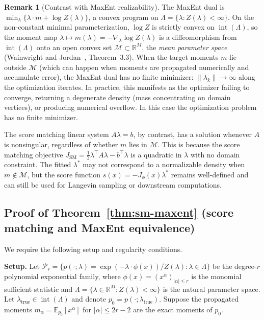 \documentclass{article}
\newcommand{\R}{\mathbb{R}}
\newcommand{\E}{\mathbb{E}}
\theoremstyle{definition}
\newtheorem{remark}{Remark}
\begin{document}
\begin{remark}[Contrast with MaxEnt realizability]\label{rmk:realizability}
The MaxEnt dual is $\min_\lambda \{\lambda \cdot m + \log Z(\lambda)\}$,
a convex program on $\Lambda = \{\lambda : Z(\lambda) < \infty\}$.
On the non-constant minimal parameterization, $\log Z$ is strictly convex on $\operatorname{int}(\Lambda)$, so
the moment map $\lambda \mapsto m(\lambda) = -\nabla_\lambda \log Z(\lambda)$
is a diffeomorphism from $\operatorname{int}(\Lambda)$ onto an open convex set
$\mathcal{M} \subset \R^M$, the \emph{mean parameter space}
(Wainwright and Jordan~\cite{wainwright2008}, Theorem~3.3).
When the target moments $m$ lie outside $\mathcal{M}$
(which can happen when moments are propagated numerically and accumulate
error), the MaxEnt dual has no finite minimizer:
$\|\lambda_k\| \to \infty$ along the optimization iterates.
In practice, this manifests as the optimizer failing to converge,
returning a degenerate density (mass concentrating on domain vertices),
or producing numerical overflow.
In this case the optimization problem has no finite minimizer.

The score matching linear system $A\lambda = b$, by contrast,
has a solution whenever $A$ is nonsingular,
regardless of whether $m$ lies in $\mathcal{M}$.
This is because the score matching objective
$J_{\mathrm{SM}} = \frac{1}{2}\lambda^\top A \lambda - b^\top \lambda$
is a quadratic in $\lambda$ with no domain constraint.
The fitted $\lambda^*$ may not correspond to a normalizable density
when $m \notin \mathcal{M}$, but the score function
$s(x) = -J_\phi(x)\lambda^*$ remains well-defined and can still
be used for Langevin sampling or downstream computations.
\end{remark}

\subsection{Proof of Theorem~\ref{thm:sm-maxent} (score matching and MaxEnt equivalence)}
\label{app:proof-equiv}

We require the following setup and regularity conditions.

\textbf{Setup.}
Let $\mathcal{P}_r = \{p(\cdot;\lambda) =
\exp(-\lambda\cdot\phi(x))/Z(\lambda) : \lambda \in \Lambda\}$
be the degree-$r$ polynomial exponential family, where
$\phi(x) = (x^\alpha)_{|\alpha| \le r}$ is the monomial sufficient statistic
and $\Lambda = \{\lambda \in \R^M : Z(\lambda) < \infty\}$
is the natural parameter space.
Let $\lambda_{\mathrm{true}} \in \operatorname{int}(\Lambda)$ and denote
$p_0 = p(\cdot;\lambda_{\mathrm{true}})$.
Suppose the propagated moments $m_\alpha = \E_{p_0}[x^\alpha]$
for $|\alpha| \le 2r-2$ are the exact moments of $p_0$.
\end{document}
